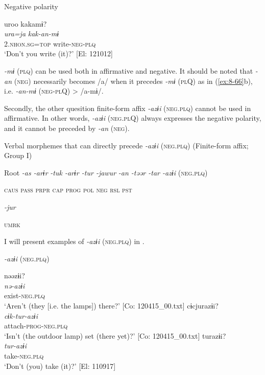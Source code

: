 \ex Negative polarity

  {\TM}
\glll  uroo  kakamɨ?\\
\textit{ura=ja}  \textit{kak-an-mɨ}\\

    2.\textsc{nhon}.\textsc{sg}=\textsc{top}  write-\textsc{neg}-\textsc{plq}\\
\glt ‘Don’t you write (it)?’ [El: 121012]

\textit{-mɨ} (\textsc{plq}) can be used both in affirmative and negative. It should be noted that \textit{-an} (\textsc{neg}) necessarily becomes /a/ when it precedes \textit{-mɨ} (\textsc{pl}Q) as in (\ref{ex:8-66}b), i.e. \textit{-an-mɨ} (\textsc{neg}-\textsc{pl}Q) > /a-mɨ/.

Secondly, the other quesition finite-form affix \textit{-azɨi} (\textsc{neg}.\textsc{plq}) cannot be used in affirmative. In other words, \textit{-azɨi} (\textsc{neg}.\textsc{pl}Q) always expresses the negative polarity, and it cannot be preceded by \textit{-an} (\textsc{neg}).

\ea\label{ex:8-67}
  Verbal morphemes that can directly precede \textit{-azɨi} (\textsc{neg}.\textsc{plq}) (Finite-form affix; Group I)

  Root  \textit{-as  -arɨr} %
\textit{-tuk  -arɨr  -tur  -jawur} %
\textit{-an  -təər  -tar  -azɨi} (\textsc{neg}.\textsc{plq})

    \textsc{caus}  \textsc{pass}  \textsc{prpr}  \textsc{cap}  \textsc{prog}  \textsc{pol}  \textsc{neg}  \textsc{rsl}  \textsc{pst}

          \textit{-jur}

          \textsc{umrk}
\z

I will present examples of \textit{-azɨi} (\textsc{neg}.\textsc{plq}) in .

\ea\label{ex:8-68}
  \textit{-azɨi} (\textsc{neg}.\textsc{plq})

\ea
{\TM}
\glll  nəəzɨi?\\
\textit{nə-azɨi}\\
exist-\textsc{neg}.\textsc{plq}\\
\glt ‘Aren’t (they [i.e. the lamps]) there?’ [Co: 120415\_00.txt]
\ex
{\TM}
\glll  cɨcjurazɨi?\\
\textit{cɨk-tur-azɨi}\\
attach-\textsc{prog}-\textsc{neg}.\textsc{plq}\\
\glt ‘Isn’t (the outdoor lamp) set (there yet)?’ [Co: 120415\_00.txt]
\ex
{\TM}
\glll  turazɨi?\\
\textit{tur-azɨi}\\
take-\textsc{neg}.\textsc{plq}\\
\glt ‘Don’t (you) take (it)?’ [El: 110917]
\z

